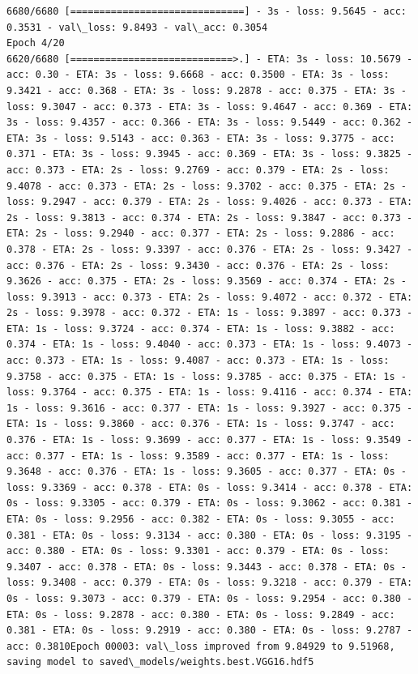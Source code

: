 \documentclass[11pt]{article}
\begin{document}
\begin{Verbatim}[commandchars=\\\{\}]
6680/6680 [==============================] - 3s - loss: 9.5645 - acc: 0.3531 - val\_loss: 9.8493 - val\_acc: 0.3054
Epoch 4/20
6620/6680 [============================>.] - ETA: 3s - loss: 10.5679 - acc: 0.30 - ETA: 3s - loss: 9.6668 - acc: 0.3500 - ETA: 3s - loss: 9.3421 - acc: 0.368 - ETA: 3s - loss: 9.2878 - acc: 0.375 - ETA: 3s - loss: 9.3047 - acc: 0.373 - ETA: 3s - loss: 9.4647 - acc: 0.369 - ETA: 3s - loss: 9.4357 - acc: 0.366 - ETA: 3s - loss: 9.5449 - acc: 0.362 - ETA: 3s - loss: 9.5143 - acc: 0.363 - ETA: 3s - loss: 9.3775 - acc: 0.371 - ETA: 3s - loss: 9.3945 - acc: 0.369 - ETA: 3s - loss: 9.3825 - acc: 0.373 - ETA: 2s - loss: 9.2769 - acc: 0.379 - ETA: 2s - loss: 9.4078 - acc: 0.373 - ETA: 2s - loss: 9.3702 - acc: 0.375 - ETA: 2s - loss: 9.2947 - acc: 0.379 - ETA: 2s - loss: 9.4026 - acc: 0.373 - ETA: 2s - loss: 9.3813 - acc: 0.374 - ETA: 2s - loss: 9.3847 - acc: 0.373 - ETA: 2s - loss: 9.2940 - acc: 0.377 - ETA: 2s - loss: 9.2886 - acc: 0.378 - ETA: 2s - loss: 9.3397 - acc: 0.376 - ETA: 2s - loss: 9.3427 - acc: 0.376 - ETA: 2s - loss: 9.3430 - acc: 0.376 - ETA: 2s - loss: 9.3626 - acc: 0.375 - ETA: 2s - loss: 9.3569 - acc: 0.374 - ETA: 2s - loss: 9.3913 - acc: 0.373 - ETA: 2s - loss: 9.4072 - acc: 0.372 - ETA: 2s - loss: 9.3978 - acc: 0.372 - ETA: 1s - loss: 9.3897 - acc: 0.373 - ETA: 1s - loss: 9.3724 - acc: 0.374 - ETA: 1s - loss: 9.3882 - acc: 0.374 - ETA: 1s - loss: 9.4040 - acc: 0.373 - ETA: 1s - loss: 9.4073 - acc: 0.373 - ETA: 1s - loss: 9.4087 - acc: 0.373 - ETA: 1s - loss: 9.3758 - acc: 0.375 - ETA: 1s - loss: 9.3785 - acc: 0.375 - ETA: 1s - loss: 9.3764 - acc: 0.375 - ETA: 1s - loss: 9.4116 - acc: 0.374 - ETA: 1s - loss: 9.3616 - acc: 0.377 - ETA: 1s - loss: 9.3927 - acc: 0.375 - ETA: 1s - loss: 9.3860 - acc: 0.376 - ETA: 1s - loss: 9.3747 - acc: 0.376 - ETA: 1s - loss: 9.3699 - acc: 0.377 - ETA: 1s - loss: 9.3549 - acc: 0.377 - ETA: 1s - loss: 9.3589 - acc: 0.377 - ETA: 1s - loss: 9.3648 - acc: 0.376 - ETA: 1s - loss: 9.3605 - acc: 0.377 - ETA: 0s - loss: 9.3369 - acc: 0.378 - ETA: 0s - loss: 9.3414 - acc: 0.378 - ETA: 0s - loss: 9.3305 - acc: 0.379 - ETA: 0s - loss: 9.3062 - acc: 0.381 - ETA: 0s - loss: 9.2956 - acc: 0.382 - ETA: 0s - loss: 9.3055 - acc: 0.381 - ETA: 0s - loss: 9.3134 - acc: 0.380 - ETA: 0s - loss: 9.3195 - acc: 0.380 - ETA: 0s - loss: 9.3301 - acc: 0.379 - ETA: 0s - loss: 9.3407 - acc: 0.378 - ETA: 0s - loss: 9.3443 - acc: 0.378 - ETA: 0s - loss: 9.3408 - acc: 0.379 - ETA: 0s - loss: 9.3218 - acc: 0.379 - ETA: 0s - loss: 9.3073 - acc: 0.379 - ETA: 0s - loss: 9.2954 - acc: 0.380 - ETA: 0s - loss: 9.2878 - acc: 0.380 - ETA: 0s - loss: 9.2849 - acc: 0.381 - ETA: 0s - loss: 9.2919 - acc: 0.380 - ETA: 0s - loss: 9.2787 - acc: 0.3810Epoch 00003: val\_loss improved from 9.84929 to 9.51968, saving model to saved\_models/weights.best.VGG16.hdf5

\end{Verbatim}
\end{document}

